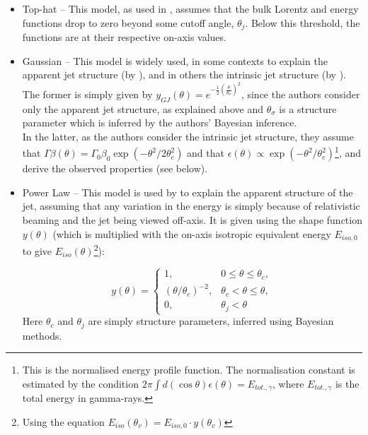     \begin{itemize}

        \item Top-hat -- This model, as used in \cite{saleem_2020B}, assumes
            that the bulk Lorentz and energy functions drop to zero beyond some cutoff
            angle, $\theta_j$. Below this threshold, the functions are at their
            respective on-axis values.

       \item Gaussian -- This model is widely used, in some contexts to explain the
           apparent jet structure (by \cite{hayes_2020}), and in others the
           intrinsic jet structure (by \cite{saleem_2020B}). The former is
           simply given by $y_{GJ}(\theta) = e^{- \frac{1}{2} \left(
           \frac{\theta}{\theta_{\sigma}} \right)^2}$, since the authors consider only
           the apparent jet structure, as explained above and $\theta_\sigma$ is a
           structure parameter which is inferred by the authors' Bayesian inference.\\
           In the latter, as the authors consider the intrinsic jet structure, they
           assume that $\Gamma \beta (\theta) = \Gamma_0 \beta_0 \exp\left(- \theta^2 /
           2\theta_c^2\right)$ and that $\epsilon (\theta) \propto \exp(- \theta^2 /
           \theta_c^2)$\footnote{
               This is the normalised energy profile function.  The normalisation
               constant is estimated by the condition $2\pi \int d(\cos \theta)
               \epsilon(\theta) = E_{tot., \gamma}$, where $E_{tot., \gamma}$ is the
               total energy in gamma-rays.
           }, and derive the observed properties (see below).

        \item Power Law -- This model is used by \cite{hayes_2020} to explain
            the apparent structure of the jet, assuming that any variation in the energy
            is simply because of relativistic beaming and the jet being viewed off-axis.
            It is given using the shape function $y(\theta)$ (which is multiplied with
            the on-axis isotropic equivalent energy $E_{iso, 0}$ to give
            $E_{iso}(\theta)$\footnote{Using the equation $E_{iso}(\theta_v) = E_{iso,
            0} \cdot y(\theta_v)$}):

                \begin{equation}
                    \label{eq:5}
                    y(\theta) = \begin{cases}
                                    1,
                                        & 0 \leq \theta \leq \theta_c, \\
                                    (\theta/\theta_c)^{-2},
                                        & \theta_c < \theta \leq \theta, \\
                                    0,
                                        & \theta_j < \theta
                                \end{cases}
                \end{equation}
                Here $\theta_c$ and $\theta_j$ are simply structure parameters, inferred
                using Bayesian methods.


\end{itemize}

